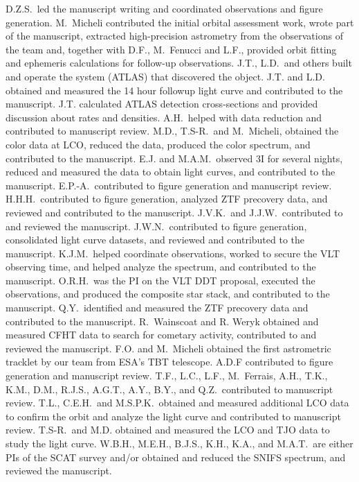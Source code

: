 \documentclass[linenumbers,twocolumn,longbib]{aastex7}
\begin{document}
\begin{contribution}


D.Z.S.\ led the manuscript writing and coordinated observations and figure generation.
M.\ Micheli contributed the initial orbital assessment work, wrote part of the manuscript, extracted high-precision astrometry from the observations of the team and, together with D.F., M.\ Fenucci and L.F., provided orbit fitting and ephemeris calculations for follow-up observations.
J.T., L.D.\ and others built and operate the system (ATLAS) that discovered the object. J.T. and L.D. obtained and measured the 14 hour followup light curve and contributed to the manuscript.  J.T.  calculated ATLAS detection cross-sections and provided discussion about rates and densities.
A.H.\ helped with data reduction and contributed to manuscript review.
M.D., T.S-R.\, and M.\ Micheli,  obtained the color data at LCO, reduced the data, produced the color spectrum, and contributed to the manuscript.
E.J. and M.A.M.\ observed 3I for several nights, reduced and measured the data to obtain light curves, and contributed to the manuscript.
E.P.-A.\ contributed to figure generation and manuscript review.
H.H.H.\ contributed to figure generation, analyzed ZTF precovery data, and reviewed and contributed to the manuscript.
J.V.K.\ and J.J.W.\ contributed to and reviewed the manuscript.
J.W.N.\ contributed to figure generation, consolidated light curve datasets, and reviewed and contributed to the manuscript.
K.J.M.\ helped coordinate observations, worked to secure the VLT observing time, and helped analyze the spectrum, and contributed to the manuscript.
O.R.H.\ was the PI on the VLT DDT proposal, executed the observations, and produced the composite star stack, and contributed to the manuscript.
Q.Y.\ identified and measured the ZTF precovery data and contributed to the manuscript.
R.\ Wainscoat and R. Weryk obtained and measured CFHT data to search for cometary activity, contributed to and reviewed the manuscript.
F.O. and M.\ Micheli obtained the first astrometric tracklet by our team from ESA's TBT telescope.
A.D.F contributed to figure generation and manuscript review.
T.F., L.C., L.F., M.\ Ferrais, A.H., T.K., K.M., D.M., R.J.S., A.G.T., A.Y., B.Y., and Q.Z.\ contributed to manuscript review.
T.L., C.E.H.\ and M.S.P.K.\ obtained and measured additional LCO data to confirm the orbit and analyze the light curve and contributed to manuscript review.
T.S-R.\ and M.D. obtained and measured the LCO and TJO data to study the light curve.
W.B.H., M.E.H., B.J.S., K.H., K.A., and M.A.T.\ are either PIs of the SCAT survey and/or obtained and reduced the SNIFS spectrum, and reviewed the manuscript.


\end{contribution}

{}

\end{document}
